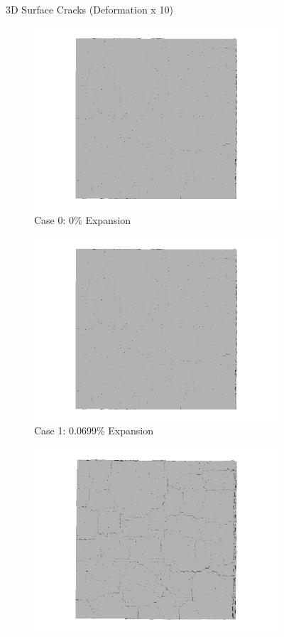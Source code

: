 \begin{figure}[!h]
  \caption{3D Surface Cracks (Deformation x 10)}
  \label{fig:ASR_A30P75_3D}
\end{figure}

\begin{figure}[!h]
\centering

    \begin{subfigure}{.5\textwidth}
      \centering
      \includegraphics[width=.8\linewidth]{Files/exp_3D/ASR/A30P75_1_3ds.png}
    \caption{Case 0: 0\% Expansion}
    \end{subfigure}%
    \begin{subfigure}{.5\textwidth}
      \centering
      \includegraphics[width=.8\linewidth]{Files/exp_3D/ASR/A30P75_1_3ds.png}
    \caption{Case 1: 0.0699\% Expansion}
    \end{subfigure}
    \begin{subfigure}{.5\textwidth}
      \centering
      \includegraphics[width=.8\linewidth]{Files/exp_3D/ASR/A30P75_2_3ds.png}

\end{subfigure}
\end{figure}
